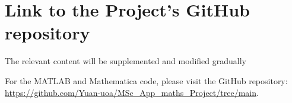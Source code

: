\chapter{Link to the Project's GitHub repository}
\hspace{0em}\noindent The relevant content will be supplemented and modified gradually

For the MATLAB and Mathematica code, please visit the GitHub repository: \url{https://github.com/Yuan-uoa/MSc_App_maths_Project/tree/main}.
